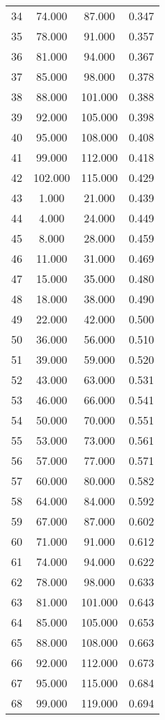 \begin{tabular}{cccc}
  34 & 74.000 & 87.000 & 0.347 \\ 
  35 & 78.000 & 91.000 & 0.357 \\ 
  36 & 81.000 & 94.000 & 0.367 \\ 
  37 & 85.000 & 98.000 & 0.378 \\ 
  38 & 88.000 & 101.000 & 0.388 \\ 
  39 & 92.000 & 105.000 & 0.398 \\ 
  40 & 95.000 & 108.000 & 0.408 \\ 
  41 & 99.000 & 112.000 & 0.418 \\ 
  42 & 102.000 & 115.000 & 0.429 \\ 
  43 & 1.000 & 21.000 & 0.439 \\ 
  44 & 4.000 & 24.000 & 0.449 \\ 
  45 & 8.000 & 28.000 & 0.459 \\ 
  46 & 11.000 & 31.000 & 0.469 \\ 
  47 & 15.000 & 35.000 & 0.480 \\ 
  48 & 18.000 & 38.000 & 0.490 \\ 
  49 & 22.000 & 42.000 & 0.500 \\ 
  50 & 36.000 & 56.000 & 0.510 \\ 
  51 & 39.000 & 59.000 & 0.520 \\ 
  52 & 43.000 & 63.000 & 0.531 \\ 
  53 & 46.000 & 66.000 & 0.541 \\ 
  54 & 50.000 & 70.000 & 0.551 \\ 
  55 & 53.000 & 73.000 & 0.561 \\ 
  56 & 57.000 & 77.000 & 0.571 \\ 
  57 & 60.000 & 80.000 & 0.582 \\ 
  58 & 64.000 & 84.000 & 0.592 \\ 
  59 & 67.000 & 87.000 & 0.602 \\ 
  60 & 71.000 & 91.000 & 0.612 \\ 
  61 & 74.000 & 94.000 & 0.622 \\ 
  62 & 78.000 & 98.000 & 0.633 \\ 
  63 & 81.000 & 101.000 & 0.643 \\ 
  64 & 85.000 & 105.000 & 0.653 \\ 
  65 & 88.000 & 108.000 & 0.663 \\ 
  66 & 92.000 & 112.000 & 0.673 \\ 
  67 & 95.000 & 115.000 & 0.684 \\ 
  68 & 99.000 & 119.000 & 0.694 \\ 

\end{tabular}

